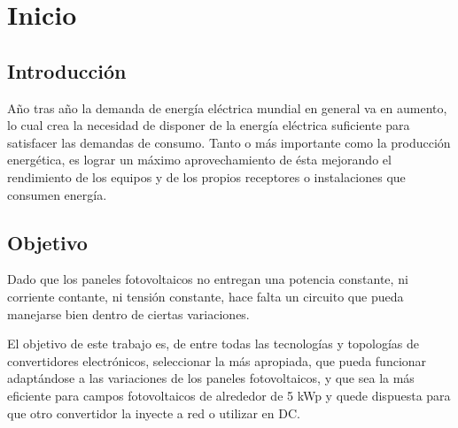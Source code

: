%
%


\section{Inicio}

\subsection{Introducción}

Año tras año la demanda de energía eléctrica mundial en general va en aumento, lo cual crea la necesidad de disponer de la energía eléctrica suficiente para satisfacer las demandas de consumo. Tanto o más importante como la producción energética, es lograr un máximo aprovechamiento de ésta mejorando el rendimiento de los equipos y de los propios receptores o instalaciones que consumen energía.

\subsection{Objetivo}

Dado que los paneles fotovoltaicos no entregan una potencia constante, ni corriente contante, ni tensión constante, hace falta un circuito que pueda manejarse bien dentro de ciertas variaciones.

El objetivo de este trabajo es, de entre todas las tecnologías y topologías de convertidores electrónicos, seleccionar la más apropiada, que pueda funcionar adaptándose a las variaciones de los paneles fotovoltaicos, y que sea la más eficiente para campos fotovoltaicos de alrededor de 5 kWp y quede dispuesta para que otro convertidor la inyecte a red o utilizar en DC. 


